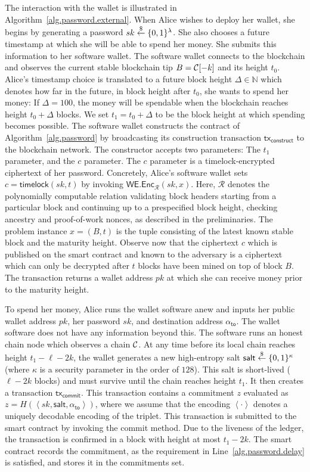 The interaction with the wallet is illustrated in Algorithm~\ref{alg.password.external}.
When Alice wishes to deploy her wallet, she
begins by generating a password $sk \overset{\$}{\gets} \{0, 1\}^\lambda$. She also chooses
a future timestamp at which she will be able to spend her money.
She submits this information to her
software wallet.
The software wallet connects to
the blockchain and observes the current stable blockchain tip $B = \mathcal{C}[-k]$
and its height $t_0$.
Alice's timestamp choice is translated to a future block height $\Delta \in \mathbb{N}$ which
denotes how far in the future,
in block height after $t_0$, she wants to spend her money: If $\Delta = 100$, the money will
be spendable when the blockchain reaches height $t_0 + \Delta$ blocks.
We set $t_1 = t_0 + \Delta$ to be the block height at which spending becomes possible.
The software wallet constructs the contract of Algorithm~\ref{alg.password}
by broadcasting its construction transaction $\textsf{tx}_\textsf{construct}$
to the blockchain network.
The constructor accepts two parameters: The $t_1$ parameter,
and the $c$ parameter. The $c$ parameter is a timelock-encrypted
ciphertext of her password. Concretely, Alice's software wallet
sets $c = \textsf{timelock}(sk, t)$ by invoking $\textsf{WE.Enc}_\mathcal{R}(sk, x)$.
Here, $\mathcal{R}$ denotes the polynomially computable relation validating block headers
starting from a particular block and continuing up to a prespecified block height, checking
ancestry and proof-of-work nonces, as described in the preliminaries. The problem instance $x = (B, t)$
is the tuple consisting of the latest known stable block and the maturity height.
Observe now that the ciphertext $c$ which is published on the
smart contract and known to the adversary is a ciphertext which can only be decrypted
after $t$ blocks have been mined on top of block $B$. The transaction returns a wallet address $pk$
at which she can receive money prior to the maturity height.

To spend her money, Alice runs the wallet software anew and inputs her public wallet address $pk$,
her password $sk$, and destination address $\alpha_{\textsf{to}}$. The wallet software does not have any information beyond this.
The software runs an honest chain node which observes a chain $\mathcal{C}$.
At any time before its local chain reaches height $t_1 - \ell - 2k$,
the wallet generates a new high-entropy salt $\textsf{salt} \overset{\$}{\gets} \{0, 1\}^\kappa$ (where $\kappa$
is a security parameter in the order of $128$). This salt
is short-lived ($\ell - 2k$ blocks) and must survive until the chain reaches height $t_1$.
It then creates a transaction $\textsf{tx}_\textsf{commit}$.
This transaction contains
a commitment $z$ evaluated as $z = H(\left<sk, \textsf{salt}, \alpha_{\textsf{to}}\right>)$,
where we assume that the encoding $\left<\cdot\right>$ denotes a uniquely decodable encoding
of the triplet.
This transaction is submitted to the smart contract by invoking the \textsf{commit} method.
Due to the liveness of the ledger, the transaction is confirmed in a block with
height at most $t_1 - 2k$. The smart contract records the commitment, as the requirement
in Line~\ref{alg.password.delay} is satisfied, and stores it in the \textsf{commitments} set.

